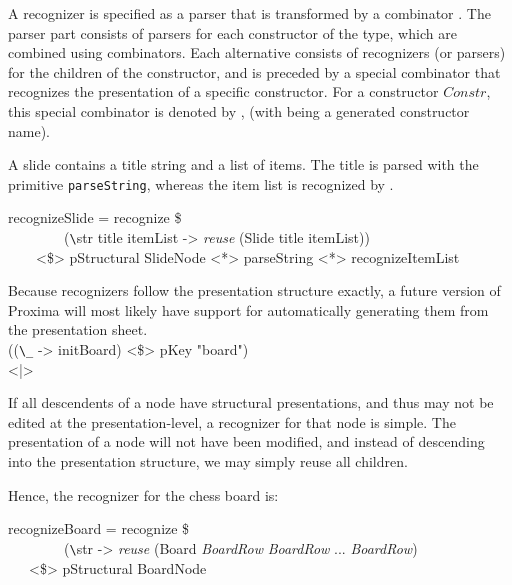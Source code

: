


A recognizer is specified as a parser that is transformed by a combinator . The parser part consists of parsers for each constructor of the type, which are combined using \p{<|>} combinators. Each alternative consists of recognizers (or parsers) for the children of the constructor, and is preceded by a special combinator that recognizes the presentation of a specific constructor. For a constructor $Constr$, this special combinator is denoted by , (with  being a generated constructor name).

A slide contains a title string and a list of items.  The title is parsed with the primitive \verb|parseString|, whereas the item list is recognized by .

\ttfamily\begin{small}\begin{tabbing}
recognizeSlide = recognize \$\\
~~~~~~~~(\verb|\|str title itemList -> {\em reuse} (Slide title itemList))\\
~~~~<\$> pStructural SlideNode <*> parseString <*> recognizeItemList
\end{tabbing}\end{small}\rmfamily

Because recognizers follow the presentation structure exactly, a future version of Proxima will most likely have support for automatically generating them from the presentation sheet. 
\bc \\
      ((\verb|\_| -> initBoard) <\$> pKey "board")\\
  <|>    \ec
  

If all descendents of a node have structural presentations, and thus may not be edited at the presentation-level, a recognizer for that node is simple. The presentation of a node will not have been modified, and instead of descending into the presentation structure, we may simply reuse all children.

Hence, the recognizer for the chess board is:

\ttfamily\begin{small}\begin{tabbing}
recognizeBoard = recognize \$\\
~~~~~~~~(\verb|\|str -> {\em reuse} (Board {\em BoardRow} {\em BoardRow} ... {\em BoardRow})\\
~~~<\$> pStructural BoardNode\\
\end{tabbing}\end{small}\rmfamily



